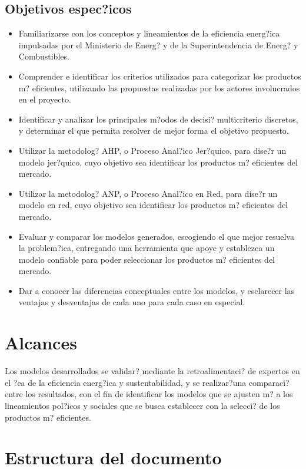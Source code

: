 \subsection{Objetivos espec?icos}
\begin{itemize}
\item Familiarizarse con los conceptos y lineamientos de la eficiencia energ?ica impulsadas por el Ministerio de Energ? y de la Superintendencia de Energ? y Combustibles.
\item Comprender e identificar los criterios utilizados para categorizar los productos m? eficientes, utilizando las propuestas realizadas por los actores involucrados en el proyecto.
\item Identificar y analizar los principales m?odos de decisi? multicriterio discretos, y determinar el que permita resolver de mejor forma el objetivo propuesto.
\item Utilizar la metodolog? AHP, o Proceso Anal?ico Jer?quico, para dise?r un modelo jer?quico, cuyo objetivo sea identificar los productos m? eficientes del mercado.
\item Utilizar la metodolog? ANP, o Proceso Anal?ico en Red, para dise?r un modelo en red, cuyo objetivo sea identificar los productos m? eficientes del mercado.
\item Evaluar y comparar los modelos generados, escogiendo el que mejor resuelva la problem?ica, entregando una herramienta que apoye y establezca un modelo confiable para poder seleccionar los productos m? eficientes del mercado.
\item Dar a conocer las diferencias conceptuales entre los modelos, y esclarecer las ventajas y desventajas de cada uno para cada caso en especial.
\end{itemize}

\section{Alcances}
\label{sec:alcances}

Los modelos desarrollados se validar? mediante la retroalimentaci? de expertos en el ?ea de la eficiencia energ?ica y sustentabilidad, y se realizar?una comparaci? entre los resultados, con el fin de identificar los modelos que se ajusten m? a los lineamientos pol?icos y sociales que se busca establecer con la selecci? de los productos m? eficientes.

\section{Estructura del documento}
\label{sec:estructura}

